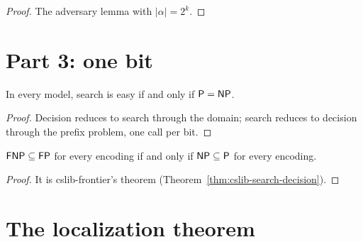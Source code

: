 \begin{proof}
  \leanok
  The adversary lemma with $|\alpha| = 2^k$.
\end{proof}

\section{Part 3: one bit}

\begin{theorem}[With one bit, going back is cheap exactly when $\cP = \cNP$]
  \label{thm:searchEasy-iff}
  \leanok
  In every model, search is easy if and only if $\cP = \cNP$.
\end{theorem}

\begin{proof}
  \leanok
  Decision reduces to search through the domain; search reduces to decision through the prefix
  problem, one call per bit.
\end{proof}

\begin{theorem}
  \label{thm:oneBit}
  \leanok
  $\mathsf{FNP} \subseteq \mathsf{FP}$ for every encoding if and only if $\mathsf{NP} \subseteq \mathsf{P}$ for every encoding.
\end{theorem}

\begin{proof}
  \leanok
  It is cslib-frontier's theorem (Theorem~\ref{thm:cslib-search-decision}).
\end{proof}

\section{The localization theorem}

